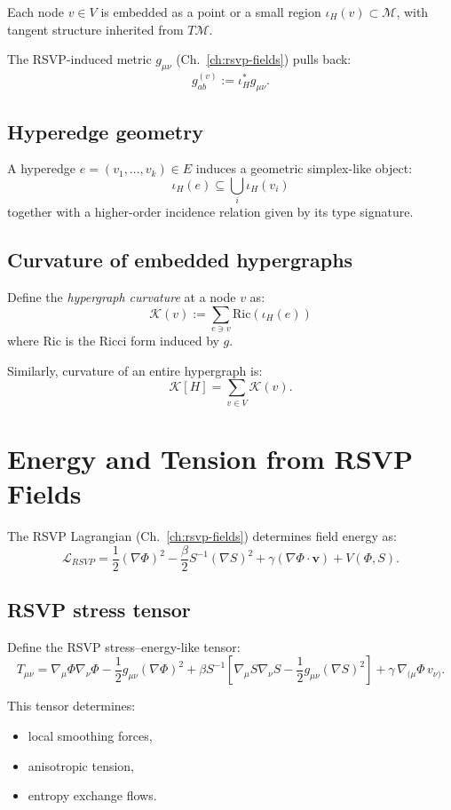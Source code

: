 Each node $v\in V$ is embedded as a point or a small region
$\iota_H(v)\subset \mathcal{M}$, with tangent structure inherited from
$T\mathcal{M}$.

The RSVP-induced metric $g_{\mu\nu}$ (Ch.~\ref{ch:rsvp-fields}) pulls back:
\[
g_{ab}^{(v)} 
:= 
\iota_H^\ast g_{\mu\nu}.
\]

\subsection{Hyperedge geometry}

A hyperedge $e=(v_1,\dots,v_k)\in E$ induces a geometric simplex-like object:
\[
\iota_H(e)
\subseteq 
\bigcup_i \iota_H(v_i)
\]
together with a higher-order incidence relation given by its type signature.

\subsection{Curvature of embedded hypergraphs}

Define the \emph{hypergraph curvature} at a node $v$ as:
\[
\mathcal{K}(v) 
:= 
\sum_{e\ni v}
\mathrm{Ric}\!\left(\iota_H(e)\right)
\]
where $\mathrm{Ric}$ is the Ricci form induced by $g$.

Similarly, curvature of an entire hypergraph is:
\[
\mathcal{K}[H]
=
\sum_{v\in V} \mathcal{K}(v).
\]

\section{Energy and Tension from RSVP Fields}

The RSVP Lagrangian (Ch.~\ref{ch:rsvp-fields}) determines field energy as:
\[
\mathcal{L}_{RSVP}
=
\frac{1}{2}(\nabla\Phi)^2
-
\frac{\beta}{2}S^{-1}(\nabla S)^2
+
\gamma(\nabla\Phi\cdot\mathbf{v})
+
V(\Phi,S).
\]

\subsection{RSVP stress tensor}

Define the RSVP stress–energy-like tensor:
\[
T_{\mu\nu}
=
\nabla_\mu\Phi\nabla_\nu\Phi
-
\frac{1}{2}g_{\mu\nu}(\nabla\Phi)^2
+
\beta S^{-1}
\left[
\nabla_\mu S \nabla_\nu S
-
\frac{1}{2}g_{\mu\nu}(\nabla S)^2
\right]
+
\gamma\,\nabla_{(\mu}\Phi\,v_{\nu)}.
\]

This tensor determines:
\begin{itemize}
  \item local smoothing forces,
  \item anisotropic tension,
  \item entropy exchange flows.
\end{itemize}

